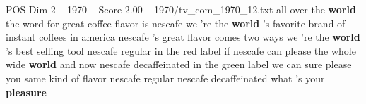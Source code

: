 \begin{textsample}{POS Dim 2 – 1970 – Score 2.00 – 1970/tv\_com\_1970\_12.txt}  \label{ex:f2_pos_055}
all over the \textbf{world} the word for great coffee flavor is nescafe we 're the \textbf{world} 's favorite brand of instant coffees in america nescafe 's great flavor comes two ways we 're the \textbf{world} 's best selling tool nescafe regular in the red label if nescafe can please the whole wide \textbf{world} and now nescafe decaffeinated in the green label we can sure please you same kind of flavor nescafe regular nescafe decaffeinated what 's your \textbf{pleasure}

\end{textsample}
